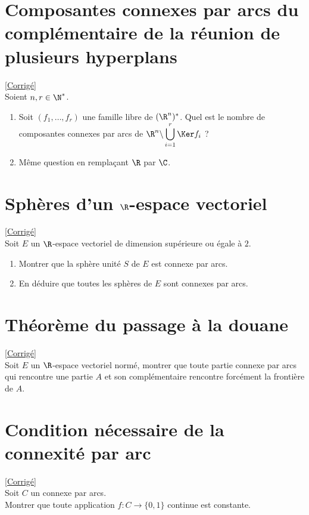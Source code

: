 \documentclass{book}
\begin{document}
\section{Composantes connexes par arcs du complémentaire de la réunion de plusieurs hyperplans }
\label{Composantes connexes par arcs du complémentaire de la réunion de plusieurs hyperplans}
\textcolor{blue}{\hyperref[sec:composantes-connexes-par-arcs-du-complementaire-de-la-reunion-de-plusieurs-hyperplans]{[Corrigé]}}\\
Soient $n,r\in \N^*$.
\begin{enumerate}
	\item Soit $(f_1,\dots,f_r)$ une famille libre de $(\R^n)^*$.
	Quel est le nombre de composantes connexes par arcs de $\R^n\backslash \displaystyle\bigcup_{i=1}^r{\Ker f_i}$ ?
	\item Même question en remplaçant $\R$ par $\C$.
\end{enumerate}

\section{Sphères d'un $\R$-espace vectoriel }
\label{Sphères d'un R espace vectoriel}
\textcolor{blue}{\hyperref[sec:spheres-dun-r-espace-vectoriel]{[Corrigé]}}\\
Soit $E$ un $\R$-espace vectoriel de dimension supérieure ou égale à $2$.
\begin{enumerate}
	\item Montrer que la sphère unité $S$ de $E$ est connexe par arcs.
	\item En déduire que toutes les sphères de $E$ sont connexes par arcs.
\end{enumerate}

\section{Théorème du passage à la douane }
\label{Théorème du passage à la douane}
\textcolor{blue}{\hyperref[sec:theoreme-du-passage-a-la-douane]{[Corrigé]}}\\
Soit $E$ un $\R$-espace vectoriel normé, montrer que toute partie connexe par arcs qui rencontre une partie $A$ et son complémentaire rencontre forcément la frontière de $A$.

\section{Condition nécessaire de la connexité par arc }
\label{Condition nécessaire de la connexité par arc}
\textcolor{blue}{\hyperref[sec:condition-necessaire-de-la-connexite-par-arc]{[Corrigé]}}\\
Soit $C$ un connexe par arcs.
\\ Montrer que toute application $f:C\to\{0,1\}$ continue est constante.
\end{document}
